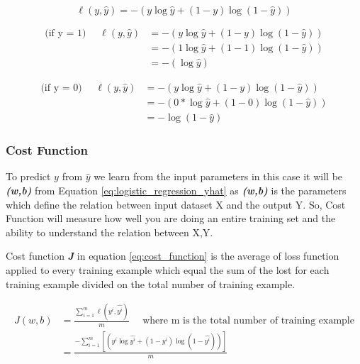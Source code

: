 \begin{equation}
  \label{eq:loss function}
    \ell(y,\widehat{y}) = - (y \log \widehat{y} + (1-y) \log (1-\widehat{y}))
  \end{equation}

\begin{equation} \label{eq:loss_function_log_y_1}
\begin{split}
  \text{(if y = 1) } \quad  \ell(y,\widehat{y}) & = - (y \log \widehat{y} + (1-y) \log (1-\widehat{y})) \\
  & = - (1 \log \widehat{y} + (1-1) \log (1-\widehat{y}))\\
  & = - (\log \widehat{y} )
\end{split}
\end{equation}


\begin{equation} \label{eq:loss_function_log_y_0}
\begin{split}
  \text{(if y = 0) } \quad  \ell(y,\widehat{y}) & = - (y \log \widehat{y} + (1-y) \log (1-\widehat{y})) \\
  & = - (0 * \log \widehat{y} + (1-0) \log (1-\widehat{y}))\\
  & = - \log (1-\widehat{y})
\end{split}
\end{equation}




\subsubsection{Cost Function}
    To predict $y$ from $\widehat{y}$ we learn from the input parameters in this case it will be \textbf{\textit{(w,b)}} from Equation \eqref{eq:logistic_regression_yhat} as  \textbf{\textit{(w,b)}} is the parameters which define the relation between input dataset X and the output Y. So, Cost Function will measure how well you are doing an entire training set and the ability to understand the relation between X,Y.

Cost function \textbf{\textit{J}} in equation \eqref{eq:cost_function} is the average of loss function applied to every training example which equal the sum of the lost for each training example divided on the total number of training example.



\begin{equation}\label{eq:cost_function}
  \begin{split}
  J(w,b) & = \frac{\sum_{i=1}^{m}  \ell(y^i,\widehat{y^i})}{m} \quad \text{ where m is the total number of training example} \\
  & = \frac {- \sum_{i=1}^{m} [(y^i \log \widehat{y^i} + (1-y^i) \log (1-\widehat{y^i}))]}{m}  
  \end{split}
\end{equation}


